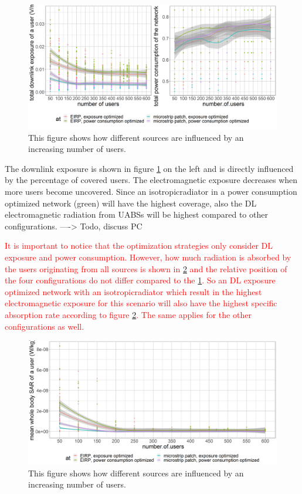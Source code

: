 \begin{figure}[h!]
  \includegraphics[width=\textwidth]{../results/s2/uvsdlAndPc.png}
  \caption{This figure shows how different sources are influenced by an increasing number of users. }
  \label{fig:s2b_dlAndPc}
\end{figure}

The downlink exposure is shown in figure \ref{fig:s2b_dlAndPc} on the left and is directly influenced by the percentage of covered users. 
The electromagnetic exposure decreases when more users become uncovered. Since an \gls{isotropicradiator} in a power consumption optimized network (green)
will have the highest coverage, also the \gls{DL} electromagnetic radiation from \gls{UABS}s will be highest compared to other configurations.
----> Todo, discuss PC

\textcolor{red}{It is important to notice that the optimization strategies only consider \gls{DL} exposure and power consumption.
However, how much radiation is absorbed by the users originating from all sources is shown in \ref{fig:s2uvssar} and the relative position of 
the four configurations do not differ compared to the \ref{fig:s2b_dlAndPc}. So an \gls{DL} exposure optimized network with an \gls{isotropicradiator}
 which result in the highest electromagnetic exposure for this scenario will also have the highest specific absorption rate according to figure
 \ref{fig:s2uvssar}. The same applies for the other configurations as well.}

\begin{figure}[h!]
  \includegraphics[width=\textwidth]{../results/s2/uvssar.png}
  \caption{This figure shows how different sources are influenced by an increasing number of users. }
  \label{fig:s2uvssar}
\end{figure}

